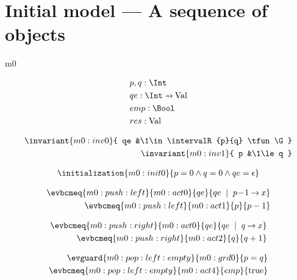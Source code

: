 \documentclass[12pt]{amsart}
\begin{document}
\section{Initial model --- A sequence of objects}
\begin{machine}{m0}

\newset{\G}

\begin{align*}
& \variable{p,q : \Int } 
\\ & \variable{qe : \Int \pfun \G }
\\ & \variable{ emp : \Bool }
\\ & \variable{ res : \G }
\end{align*}

\begin{align*}
\invariant{m0:inv0}{ qe &\1\in \intervalR{p}{q} \tfun \G }
\\ \invariant{m0:inv1}{ p &\1\le q }
\end{align*}

\begin{align*}
\initialization{m0:init0}{p = 0 \land q = 0 \land qe = \emptyfun }
\end{align*}


\begin{align*}
\evbcmeq{m0:push:left}{m0:act0}{qe}{ qe \2| p\0-1 \fun x }
\\ \evbcmeq{m0:push:left}{m0:act1}{p}{ p-1 }
\end{align*}


\begin{align*}
\evbcmeq{m0:push:right}{m0:act0}{qe}{ qe \2| q \fun x }
\\ \evbcmeq{m0:push:right}{m0:act2}{q}{ q+1 }
\end{align*}


\begin{align*}
\evguard{m0:pop:left:empty}{m0:grd0}
	{ p = q }
\\ \evbcmeq{m0:pop:left:empty}{m0:act4}
	{emp}{ \true }
\end{align*}



\end{machine}
\end{document}
